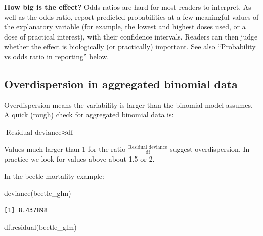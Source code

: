 \documentclass[
  letterpaper,
  8pt,
  a4paper]{book}
\newenvironment{Shaded}{\begin{snugshade}}{\end{snugshade}}
\newcommand{\FunctionTok}[1]{\textcolor[rgb]{0.28,0.35,0.67}{#1}}
\newcommand{\NormalTok}[1]{\textcolor[rgb]{0.00,0.23,0.31}{#1}}
\begin{document}
\begin{tcolorbox}[enhanced jigsaw, arc=.35mm, bottomrule=.15mm, bottomtitle=1mm, breakable, colback=white, colbacktitle=quarto-callout-tip-color!10!white, colframe=quarto-callout-tip-color-frame, coltitle=black, left=2mm, leftrule=.75mm, opacityback=0, opacitybacktitle=0.6, rightrule=.15mm, title=\textcolor{quarto-callout-tip-color}{\faLightbulb}\hspace{0.5em}{Tip}, titlerule=0mm, toprule=.15mm, toptitle=1mm]

\textbf{How big is the effect?} Odds ratios are hard for most readers to
interpret. As well as the odds ratio, report predicted probabilities at
a few meaningful values of the explanatory variable (for example, the
lowest and highest doses used, or a dose of practical interest), with
their confidence intervals. Readers can then judge whether the effect is
biologically (or practically) important. See also ``Probability vs odds
ratio in reporting'' below.

\end{tcolorbox}

\subsection*{Overdispersion in aggregated binomial
data}\label{overdispersion-in-aggregated-binomial-data}

Overdispersion means the variability is larger than the binomial model
assumes. A quick (rough) check for aggregated binomial data is:

\(\text{Residual deviance} \approx \text{df}\)

Values much larger than 1 for the ratio
\(\frac{\text{Residual deviance}}{\text{df}}\) suggest overdispersion.
In practice we look for values above about 1.5 or 2.

In the beetle mortality example:

\begin{Shaded}
\begin{Highlighting}[]
\FunctionTok{deviance}\NormalTok{(beetle\_glm)}
\end{Highlighting}
\end{Shaded}

\begin{verbatim}
[1] 8.437898
\end{verbatim}

\begin{Shaded}
\begin{Highlighting}[]
\FunctionTok{df.residual}\NormalTok{(beetle\_glm)}
\end{Highlighting}
\end{Shaded}
\end{document}
